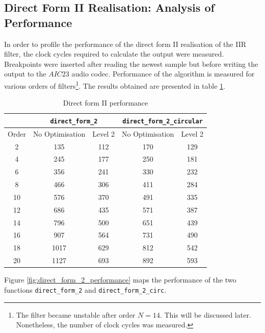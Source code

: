 \documentclass{article}
\begin{document}
\subsection{Direct Form II Realisation: Analysis of Performance}
In order to profile the performance of the direct form II realisation of the IIR filter, the clock cycles required to calculate the output were measured. Breakpoints were inserted after reading the newest sample but before writing the output to the $AIC23$ audio codec. Performance of the algorithm is measured for various orders of filters\footnote{The filter became unstable after order $N=14$. This will be discussed later. Nonetheless, the number of clock cycles was measured.}. The results obtained are presented in table \ref{tab:direct_form_2}.

\begin{table}[H]
  \centering
    \begin{tabular}{|r|c|c|c|c|}
\cline{2-5}    \multicolumn{1}{r|}{} & \multicolumn{2}{c|}{{\tt direct\_form\_2}} & \multicolumn{2}{c|}{{\tt direct\_form\_2\_circular}} \\
    \hline
    \multicolumn{1}{|c|}{Order} & No Optimisation & Level 2 & No Optimisation & Level 2 \\
    \hline
    \multicolumn{1}{|c|}{2} & 135 & 112 & 170 & 129 \\
    \hline
    \multicolumn{1}{|c|}{4} & 245 & 177   & 250 & 181 \\
    \hline
    \multicolumn{1}{|c|}{6} & 356   & 241 & 330 & 232 \\
    \hline
    \multicolumn{1}{|c|}{8} & 466 & 306 & 411   & 284 \\
    \hline
    \multicolumn{1}{|c|}{10} & 576 & 370 & 491 & 335 \\
    \hline
    \multicolumn{1}{|c|}{12} & 686 & 435 & 571 & 387 \\
    \hline
    \multicolumn{1}{|c|}{14} & 796 & 500   & 651 & 439 \\
    \hline
    \multicolumn{1}{|c|}{16} & 907   & 564 & 731 & 490 \\
    \hline
    \multicolumn{1}{|c|}{18} & 1017 & 629 & 812   & 542 \\
    \hline
    \multicolumn{1}{|c|}{20} & 1127 & 693 & 892 & 593 \\
    \hline
    \end{tabular}%
    \caption{Direct form II performance}
  \label{tab:direct_form_2}%
\end{table}%


Figure \ref{fig:direct_form_2_performance} maps the performance of the two functions {\tt direct\_form\_2} and {\tt direct\_form\_2\_circ}.
\end{document}
